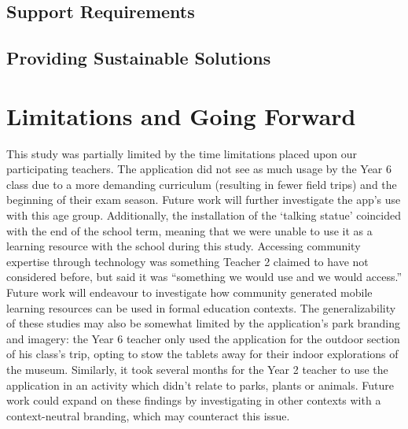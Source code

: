 \subsection{Support Requirements}
\subsection{Providing Sustainable Solutions}

\section{Limitations and Going Forward}

This study was partially limited by the time limitations placed upon our
participating teachers. The application did not see as much usage by the Year 6
class due to a more demanding curriculum (resulting in fewer field trips) and
the beginning of their exam season. Future work will further investigate the
app’s use with this age group. Additionally, the installation of the ‘talking
statue’ coincided with the end of the school term, meaning that we were unable
to use it as a learning resource with the school during this study. Accessing
community expertise through technology was something Teacher 2 claimed to have
not considered before, but said it was “something we would use and we would
access.” Future work will endeavour to investigate how community generated
mobile learning resources can be used in formal education contexts. The
generalizability of these studies may also be somewhat limited by the
application’s park branding and imagery: the Year 6 teacher only used the
application for the outdoor section of his class’s trip, opting to stow the
tablets away for their indoor explorations of the museum. Similarly, it took
several months for the Year 2 teacher to use the application in an activity
which didn’t relate to parks, plants or animals. Future work could expand on
these findings by investigating in other contexts with a context-neutral
branding, which may counteract this issue.

